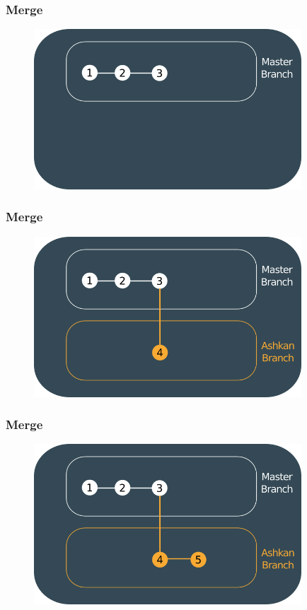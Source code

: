 \documentclass{beamer}
\begin{document}
	\begin{frame}
		\frametitle{Merge}
		\begin{figure}[htbp]
			\centering
			\includegraphics[width=10cm]{howgitwork11}
		\end{figure}
	\end{frame}
	
	\begin{frame}
		\frametitle{Merge}
		\begin{figure}[htbp]
			\centering
			\includegraphics[width=10cm]{howgitwork12}
		\end{figure}
	\end{frame}
	
	\begin{frame}
		\frametitle{Merge}
		\begin{figure}[htbp]
			\centering
			\includegraphics[width=10cm]{howgitwork13}
		\end{figure}
	\end{frame}
	
\end{document}
